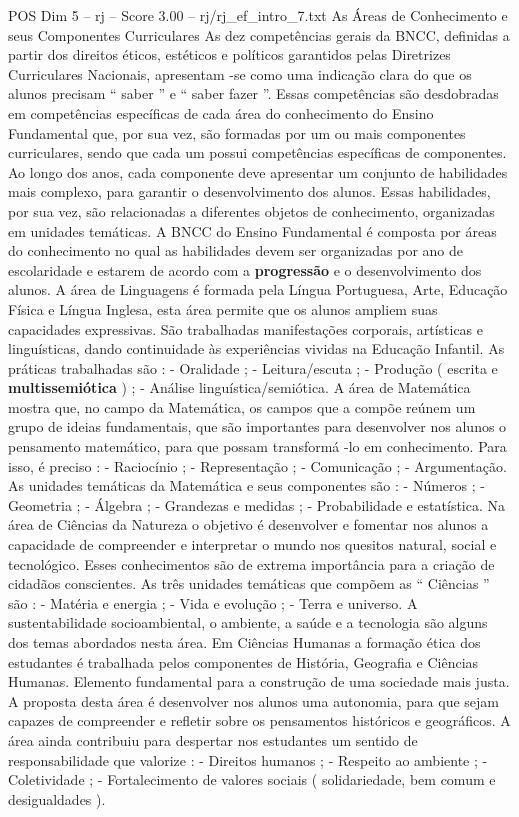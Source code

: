 \begin{textsample}{POS Dim 5 – rj – Score 3.00 – rj/rj\_ef\_intro\_7.txt}  \label{ex:f5_pos_200}
As Áreas de Conhecimento e seus Componentes Curriculares As dez competências gerais da BNCC, definidas a partir dos direitos éticos, estéticos e políticos garantidos pelas Diretrizes Curriculares Nacionais, apresentam -se como uma indicação clara do que os alunos precisam “ saber ” e “ saber fazer ”.
Essas competências são desdobradas em competências específicas de cada área do conhecimento do Ensino Fundamental que, por sua vez, são formadas por um ou mais componentes curriculares, sendo que cada um possui competências específicas de componentes.
Ao longo dos anos, cada componente deve apresentar um conjunto de habilidades mais complexo, para garantir o desenvolvimento dos alunos.
Essas habilidades, por sua vez, são relacionadas a diferentes objetos de conhecimento, organizadas em unidades temáticas.
A BNCC do Ensino Fundamental é composta por áreas do conhecimento no qual as habilidades devem ser organizadas por ano de escolaridade e estarem de acordo com a \textbf{progressão} e o desenvolvimento dos alunos.
A área de Linguagens é formada pela Língua Portuguesa, Arte, Educação Física e Língua Inglesa, esta área permite que os alunos ampliem suas capacidades expressivas.
São trabalhadas manifestações corporais, artísticas e linguísticas, dando continuidade às experiências vividas na Educação Infantil.
As práticas trabalhadas são : - Oralidade ; - Leitura/escuta ; - Produção ( escrita e \textbf{multissemiótica} ) ; - Análise linguística/semiótica.
A área de Matemática mostra que, no campo da Matemática, os campos que a compõe reúnem um grupo de ideias fundamentais, que são importantes para desenvolver nos alunos o pensamento matemático, para que possam transformá -lo em conhecimento.
Para isso, é preciso : - Raciocínio ; - Representação ; - Comunicação ; - Argumentação.
As unidades temáticas da Matemática e seus componentes são : - Números ; - Geometria ; - Álgebra ; - Grandezas e medidas ; - Probabilidade e estatística.
Na área de Ciências da Natureza o objetivo é desenvolver e fomentar nos alunos a capacidade de compreender e interpretar o mundo nos quesitos natural, social e tecnológico.
Esses conhecimentos são de extrema importância para a criação de cidadãos conscientes.
As três unidades temáticas que compõem as “ Ciências ” são : - Matéria e energia ; - Vida e evolução ; - Terra e universo.
A sustentabilidade socioambiental, o ambiente, a saúde e a tecnologia são alguns dos temas abordados nesta área.
Em Ciências Humanas a formação ética dos estudantes é trabalhada pelos componentes de História, Geografia e Ciências Humanas.
Elemento fundamental para a construção de uma sociedade mais justa.
A proposta desta área é desenvolver nos alunos uma autonomia, para que sejam capazes de compreender e refletir sobre os pensamentos históricos e geográficos.
A área ainda contribuiu para despertar nos estudantes um sentido de responsabilidade que valorize : - Direitos humanos ; - Respeito ao ambiente ; - Coletividade ; - Fortalecimento de valores sociais ( solidariedade, bem comum e desigualdades ).

\end{textsample}
